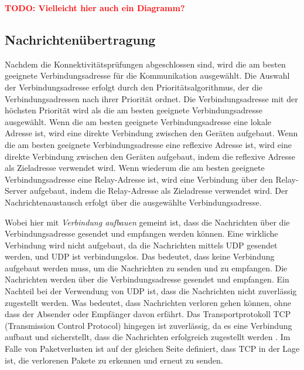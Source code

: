 \textbf{\textcolor{red}{TODO: Vielleicht hier auch ein Diagramm?}}

\subsection{Nachrichtenübertragung}

Nachdem die Konnektivitätsprüfungen abgeschlossen sind, wird die am besten geeignete Verbindungsadresse für die Kommunikation ausgewählt. Die Auswahl der Verbindungsadresse erfolgt durch den Prioritätsalgorithmus, der die Verbindungsadressen nach ihrer Priorität ordnet. Die Verbindungsadresse mit der höchsten Priorität wird als die am besten geeignete Verbindungsadresse ausgewählt. Wenn die am besten geeignete Verbindungsadresse eine lokale Adresse ist, wird eine direkte Verbindung zwischen den Geräten aufgebaut. Wenn die am besten geeignete Verbindungsadresse eine reflexive Adresse ist, wird eine direkte Verbindung zwischen den Geräten aufgebaut, indem die reflexive Adresse als Zieladresse verwendet wird. Wenn wiederum die am besten geeignete Verbindungsadresse eine Relay-Adresse ist, wird eine Verbindung über den Relay-Server aufgebaut, indem die Relay-Adresse als Zieladresse verwendet wird. Der Nachrichtenaustausch erfolgt über die ausgewählte Verbindungsadresse. 

Wobei hier mit \textit{Verbindung aufbauen} gemeint ist, dass die Nachrichten über die Verbindungsadresse gesendet und empfangen werden können. Eine wirkliche Verbindung wird nicht aufgebaut, da die Nachrichten mittels UDP gesendet werden, und UDP ist verbindungslos. Das bedeutet, dass keine Verbindung aufgebaut werden muss, um die Nachrichten zu senden und zu empfangen. Die Nachrichten werden über die Verbindungsadresse gesendet und empfangen. Ein Nachteil bei der Verwendung von UDP ist, dass die Nachrichten nicht zuverlässig zugestellt werden. Was bedeutet, dass Nachrichten verloren gehen können, ohne dass der Absender oder Empfänger davon erfährt. Das Transportprotokoll TCP (Transmission Control Protocol) hingegen ist zuverlässig, da es eine Verbindung aufbaut und sicherstellt, dass die Nachrichten erfolgreich zugestellt werden \parencite[S. 36]{rfc9293_TCP}. Im Falle von Paketverlusten ist auf der gleichen Seite definiert, dass TCP in der Lage ist, die verlorenen Pakete zu erkennen und erneut zu senden.

